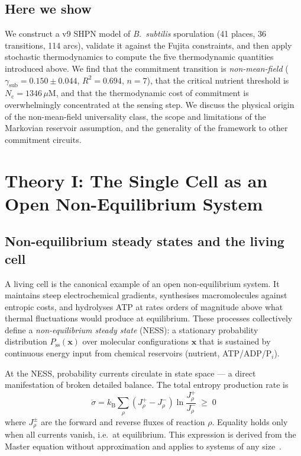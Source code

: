 \documentclass[11pt,a4paper]{article}
\newcommand{\kB}{k_{\mathrm{B}}}
\newcommand{\EPR}{\dot{\sigma}}
\newcommand{\gsub}{\gamma_{\mathrm{sub}}}
\newcommand{\Nc}{N_{\mathrm{c}}}
\begin{document}
\subsection*{Here we show}

We construct a v9 SHPN model of \textit{B.~subtilis} sporulation (41
places, 36 transitions, 114 arcs), validate it against the Fujita
constraints, and then apply stochastic thermodynamics to compute the five
thermodynamic quantities introduced above.
We find that the commitment transition is \emph{non-mean-field}
($\gsub = 0.150 \pm 0.044$, $R^2 = 0.694$, $n = 7$), that the critical
nutrient threshold is $\Nc = 1346\,\mu$M, and that the thermodynamic cost
of commitment is overwhelmingly concentrated at the sensing step.
We discuss the physical origin of the non-mean-field universality class,
the scope and limitations of the Markovian reservoir assumption, and the
generality of the framework to other commitment circuits.

\section{Theory I: The Single Cell as an Open Non-Equilibrium System}
\label{sec:nesm}

\subsection{Non-equilibrium steady states and the living cell}

A living cell is the canonical example of an open non-equilibrium system.
It maintains steep electrochemical gradients, synthesises macromolecules
against entropic costs, and hydrolyses ATP at rates orders of magnitude
above what thermal fluctuations would produce at equilibrium.
These processes collectively define a \emph{non-equilibrium steady state}
(NESS): a stationary probability distribution $P_{\mathrm{ss}}(\mathbf{x})$
over molecular configurations $\mathbf{x}$ that is sustained by
continuous energy input from chemical reservoirs (nutrient, ATP/ADP/P$_i$).

At the NESS, probability currents circulate in state space --- a direct
manifestation of broken detailed balance.
The total entropy production rate is
\begin{equation}
  \EPR = \kB \sum_\rho \left(J_\rho^+ - J_\rho^-\right)
         \ln \frac{J_\rho^+}{J_\rho^-} \;\geq\; 0
  \label{eq:epr_def}
\end{equation}
where $J_\rho^\pm$ are the forward and reverse fluxes of reaction $\rho$.
Equality holds only when all currents vanish, i.e.\ at equilibrium.
This expression is derived from the Master equation without approximation
and applies to systems of any size~\cite{Schnakenberg1976,Seifert2012}.
\end{document}
